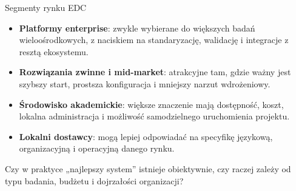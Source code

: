 \begin{frame}{Segmenty rynku EDC}
  \begin{itemize}
    \item \textbf{Platformy enterprise}: zwykle wybierane do większych badań wieloośrodkowych, z naciskiem na standaryzację, walidację i integracje z resztą ekosystemu.
    \item \textbf{Rozwiązania zwinne i mid-market}: atrakcyjne tam, gdzie ważny jest szybszy start, prostsza konfiguracja i mniejszy narzut wdrożeniowy.
    \item \textbf{Środowisko akademickie}: większe znaczenie mają dostępność, koszt, lokalna administracja i możliwość samodzielnego uruchomienia projektu.
    \item \textbf{Lokalni dostawcy}: mogą lepiej odpowiadać na specyfikę językową, organizacyjną i operacyjną danego rynku.
  \end{itemize}

  \vspace{0.25cm}

  \begin{QuestionBox}
    Czy w praktyce „najlepszy system” istnieje obiektywnie, czy raczej zależy od typu badania, budżetu i dojrzałości organizacji?
  \end{QuestionBox}
\end{frame}

